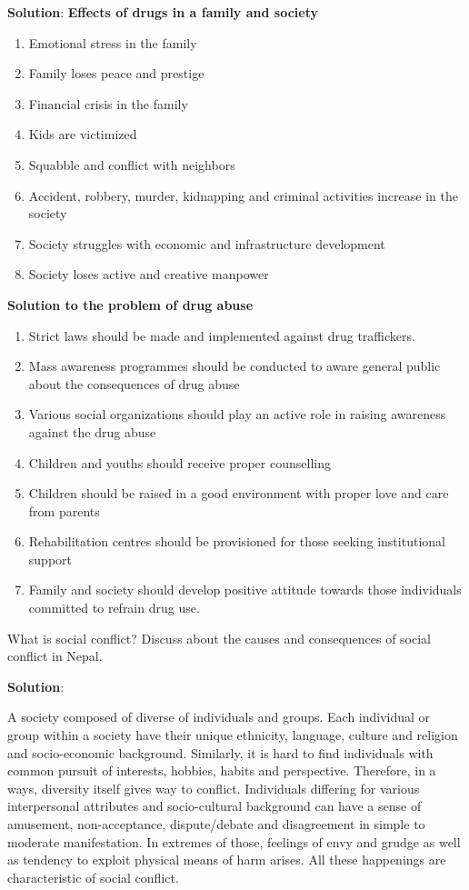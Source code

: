 \documentclass[
  openany]{book}
\newcommand{\question}{\item}
\newenvironment{solution}{ {\bfseries Solution}:}{}
\begin{document}
\begin{questions}
\begin{solution}
\textbf{Effects of drugs in a family and society}
\begin{enumerate}
\item Emotional stress in the family
\item Family loses peace and prestige
\item Financial crisis in the family
\item Kids are victimized
\item Squabble and conflict with neighbors
\item Accident, robbery, murder, kidnapping and criminal activities increase in the society
\item Society struggles with economic and infrastructure development
\item Society loses active and creative manpower
\end{enumerate}

\textbf{Solution to the problem of drug abuse}
\begin{enumerate}
\item Strict laws should be made and implemented against drug traffickers.
\item Mass awareness programmes should be conducted to aware general public about the consequences of drug abuse
\item Various social organizations should play an active role in raising awareness against the drug abuse
\item Children and youths should receive proper counselling
\item Children should be raised in a good environment with proper love and care from parents
\item Rehabilitation centres should be provisioned for those seeking institutional support
\item Family and society should develop positive attitude towards those individuals committed to refrain drug use.
\end{enumerate}
\end{solution}

\question What is social conflict? Discuss about the causes and consequences of social conflict in Nepal.

\begin{solution}

A society composed of diverse of individuals and groups. Each individual or group within a society have their unique ethnicity, language, culture and religion and socio-economic background. Similarly, it is hard to find individuals with common pursuit of interests, hobbies, habits and perspective. Therefore, in a ways, diversity itself gives way to conflict. Individuals differing for various interpersonal attributes and socio-cultural background can have a sense of amusement, non-acceptance, dispute/debate and disagreement in simple to moderate manifestation. In extremes of those, feelings of envy and grudge as well as tendency to exploit physical means of harm arises. All these happenings are characteristic of social conflict.


\end{solution}
\end{questions}
\end{document}
